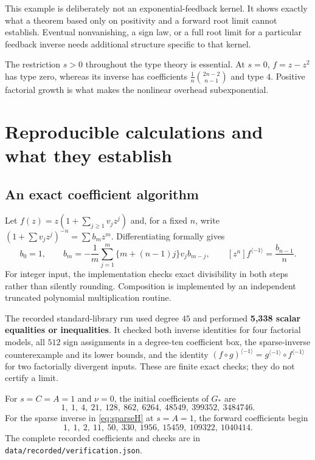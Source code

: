 \documentclass[11pt,a4paper]{article}
\theoremstyle{definition}
\theoremstyle{remark}
\newcommand{\inv}{^{\langle-1\rangle}}
\numberwithin{equation}{section}
\begin{document}
This example is deliberately not an exponential-feedback kernel. It
shows exactly what a theorem based only on positivity and a forward
root limit cannot establish. Eventual nonvanishing, a sign law, or a
full root limit for a particular feedback inverse needs additional
structure specific to that kernel.

The restriction $s>0$ throughout the type theory is essential. At
$s=0$, $f=z-z^2$ has type zero, whereas its inverse has coefficients
$\frac1n\binom{2n-2}{n-1}$ and type $4$. Positive factorial growth is
what makes the nonlinear overhead subexponential.

\section{Reproducible calculations and what they establish}
\label{sec:computations}

\subsection{An exact coefficient algorithm}
Let $f(z)=z(1+\sum_{j\ge1}v_jz^j)$ and, for a fixed $n$, write
$(1+\sum v_jz^j)^{-n}=\sum b_mz^m$. Differentiating formally gives
\begin{equation}
 b_0=1,\qquad
 b_m=-\frac1m\sum_{j=1}^m\{m+(n-1)j\}v_jb_{m-j},\qquad
 [z^n]f\inv=\frac{b_{n-1}}n.
 \label{eq:algorithm}
\end{equation}
For integer input, the implementation checks exact divisibility in both
steps rather than silently rounding. Composition is implemented by an
independent truncated polynomial multiplication routine.

The recorded standard-library run used degree $45$ and performed
\textbf{5,338 scalar equalities or inequalities}. It checked both inverse
identities for four factorial models, all $512$ sign assignments in a
degree-ten coefficient box, the sparse-inverse counterexample and its
lower bounds, and the identity
$(f\circ g)\inv=g\inv\circ f\inv$ for two factorially divergent
inputs. These are finite exact checks; they do not certify a limit.

For $s=C=A=1$ and $\nu=0$, the initial coefficients of $G_*$ are
\[
 1,\ 1,\ 4,\ 21,\ 128,\ 862,\ 6264,\ 48549,\ 399352,\ 3484746.
\]
For the sparse inverse in \eqref{eq:sparseH} at $s=A=1$, the forward
coefficients begin
\[
 1,\ 1,\ 2,\ 11,\ 50,\ 330,\ 1956,\ 15459,\ 109322,\ 1040414.
\]
The complete recorded coefficients and checks are in
\texttt{data/recorded/verification.json}.
\end{document}
